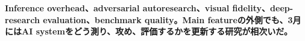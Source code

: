 \noindent\textbf{Inference overhead、adversarial autoresearch、visual fidelity、deep-research evaluation、benchmark quality。Main featureの外側でも、3月にはAI systemをどう測り、攻め、評価するかを更新する研究が相次いだ。}\autocite{src-198727200361,src-4553a7bbd23e,src-5d84874f2d03,src-a27679e5527b,src-bb83c9c55568}
